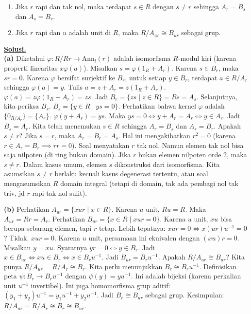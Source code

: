 \documentclass[12pt,twoside]{article}
\newenvironment{solution}
{
	\par\noindent\textbf{\underline{Solusi.}}\\
}
{
	\par
}
\begin{document}
\begin{enumerate}
        \begin{enumerate}
          \item Jika $r$ rapi dan tak nol, maka terdapat $s \in R$ dengan $s \ne r$ sehingga $A_r = B_s$ dan $A_s = B_r$.
          \item Jika $r$ rapi dan $u$ adalah unit di $R$, maka $R/A_{ur} \cong B_{ur}$ sebagai grup.
        \end{enumerate}
        \begin{solution}
          \textbf{(a)} Diketahui $\varphi : R/Rr \to \text{Ann}_l(r)$ adalah isomorfisma $R$-modul kiri (karena properti linearitas $x\varphi(a)$).
          Misalkan $s = \varphi(1_R + A_r)$.
          Karena $s \in B_r$, maka $sr = 0$.
          Karena $\varphi$ bersifat surjektif ke $B_r$, untuk setiap $y \in B_r$, terdapat $a \in R/A_r$ sehingga $\varphi(a) = y$.
          Tulis $a = z + A_r = z(1_R + A_r)$.
          $\varphi(a) = z \varphi(1_R + A_r) = zs$.
          Jadi $B_r = \{zs \mid z \in R\} = Rs = A_s$.
          Selanjutnya, kita periksa $B_s$.
          $B_s = \{y \in R \mid ys=0\}$.
          Perhatikan bahwa kernel $\varphi$ adalah $\{0_{R/A_r}\} = \{A_r\}$.
          $\varphi(y + A_r) = ys$.
          Maka $ys = 0 \iff y + A_r = A_r \iff y \in A_r$.
          Jadi $B_s = A_r$.
          Kita telah menemukan $s \in R$ sehingga $A_r = B_s$ dan $A_s = B_r$.
          Apakah $s \ne r$?
          Jika $s=r$, maka $A_r = B_r = A_s$.
          Hal ini mengakibatkan $r^2 = 0$ (karena $r \in A_r = B_r \implies rr=0$).
          Soal menyatakan $r$ tak nol. Namun elemen tak nol bisa saja nilpoten (di ring bukan domain).
          Jika $r$ bukan elemen nilpoten orde 2, maka $s \ne r$.
          Dalam kasus umum, elemen $s$ dikonstruksi dari isomorfisma. Kita asumsikan $s \ne r$ berlaku kecuali kasus degenerasi tertentu, atau soal mengasumsikan $R$ domain integral (tetapi di domain, tak ada pembagi nol tak triv, jd $r$ rapi tak nol sulit).

          \textbf{(b)} Perhatikan $A_{ur} = \{xur \mid x \in R\}$. Karena $u$ unit, $Ru = R$. Maka $A_{ur} = Rr = A_r$.
          Perhatikan $B_{ur} = \{x \in R \mid xur = 0\}$. Karena $u$ unit, $xu$ bisa berupa sebarang elemen, tapi $r$ tetap.
          Lebih tepatnya: $xur=0 \iff x(ur)u^{-1} = 0$? Tidak.
          $xur=0$. Karena $u$ unit, persamaan ini ekuivalen dengan $(xu)r = 0$.
          Misalkan $y=xu$. Syaratnya $yr=0 \iff y \in B_r$.
          Jadi $x \in B_{ur} \iff xu \in B_r \iff x \in B_r u^{-1}$.
          Jadi $B_{ur} = B_r u^{-1}$.
          Apakah $R/A_{ur} \cong B_{ur}$?
          Kita punya $R/A_{ur} = R/A_r \cong B_r$.
          Kita perlu menunjukkan $B_r \cong B_r u^{-1}$.
          Definisikan peta $\psi: B_r \to B_r u^{-1}$ dengan $\psi(y) = y u^{-1}$.
          Ini adalah bijeksi (karena perkalian unit $u^{-1}$ invertibel).
          Ini juga homomorfisma grup aditif: $(y_1+y_2)u^{-1} = y_1 u^{-1} + y_2 u^{-1}$.
          Jadi $B_r \cong B_{ur}$ sebagai grup.
          Kesimpulan: $R/A_{ur} = R/A_r \cong B_r \cong B_{ur}$.
        \end{solution}


\end{enumerate}
\end{document}
